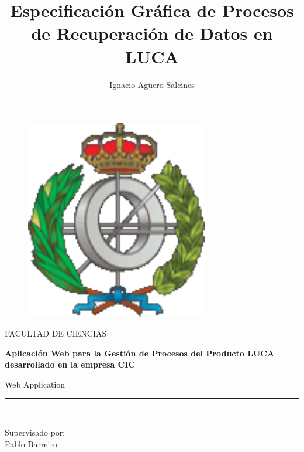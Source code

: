 \documentclass[a4paper,12pt]{article}
\author{Ignacio Agüero Salcines}
\title{Especificación Gráfica de Procesos de Recuperación de Datos en LUCA}
\begin{document}
	\begin{titlepage}
		\begin{center}

	
		\vspace*{-1in}

	
			\begin{figure}[htb]
				\begin{center}
					\includegraphics[width=8cm]{logoFacultadInformatica}
				\end{center}
			\end{figure}
	
			FACULTAD DE CIENCIAS\\

			\vspace*{0.2in}

			\begin{Huge}
				\textbf{Aplicación Web para la Gestión de Procesos del Producto LUCA desarrollado en la empresa CIC} \\
			\end{Huge}
			\vspace*{0.3in}
			\begin{large}
				Web Application\\
			\end{large}
			\vspace*{0.3in}
			\rule{80mm}{0.1mm}\\
			\vspace*{0.1in}
			\begin{large}
				Supervisado por: \\
				Pablo Barreiro \\
			\end{large}
			\end{center}
		

\end{titlepage}
\end{document}

